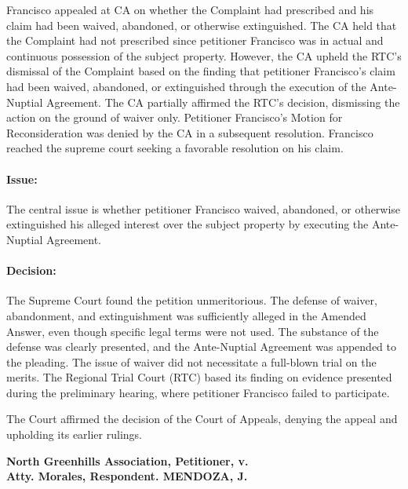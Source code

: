 \documentclass[
12pt,
oneside,
onehalfspacing,
headsepline
]{DigestCollection}
\begin{document}
Francisco appealed at CA on whether the Complaint had prescribed and his claim had been waived, abandoned, or otherwise extinguished. The CA held that the Complaint had not prescribed since petitioner Francisco was in actual and continuous possession of the subject property. However, the CA upheld the RTC's dismissal of the Complaint based on the finding that petitioner Francisco's claim had been waived, abandoned, or extinguished through the execution of the Ante-Nuptial Agreement. The CA partially affirmed the RTC's decision, dismissing the action on the ground of waiver only. Petitioner Francisco's Motion for Reconsideration was denied by the CA in a subsequent resolution. Francisco reached the supreme court seeking a favorable resolution on his claim.

\paragraph{Issue:}


The central issue is whether petitioner Francisco waived, abandoned, or otherwise extinguished his alleged interest over the subject property by executing the Ante-Nuptial Agreement.

\paragraph{Decision:}


The Supreme Court found the petition unmeritorious. The defense of waiver, abandonment, and extinguishment was sufficiently alleged in the Amended Answer, even though specific legal terms were not used. The substance of the defense was clearly presented, and the Ante-Nuptial Agreement was appended to the pleading. The issue of waiver did not necessitate a full-blown trial on the merits. The Regional Trial Court (RTC) based its finding on evidence presented during the preliminary hearing, where petitioner Francisco failed to participate.

The Court affirmed the decision of the Court of Appeals, denying the appeal and upholding its earlier rulings.



\noindent\textbf{North Greenhills Association, Petitioner, v. \\Atty. Morales, Respondent. MENDOZA, J.}\vspace{0.4cm}
\end{document}
